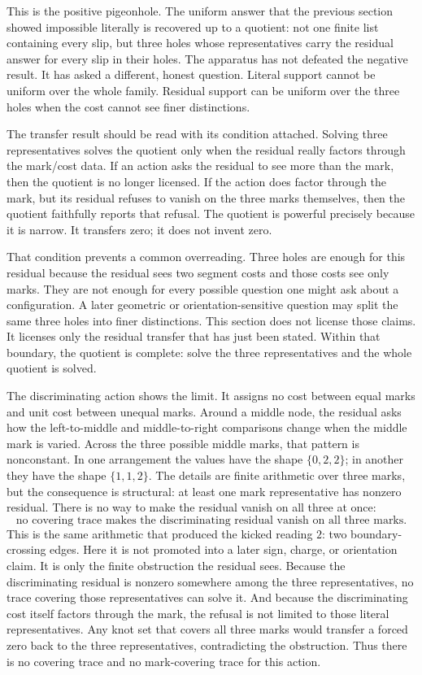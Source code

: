 This is the positive pigeonhole. The uniform answer that the previous section
showed impossible literally is recovered up to a quotient: not one finite list
containing every slip, but three holes whose representatives carry the residual
answer for every slip in their holes. The apparatus has not defeated the
negative result. It has asked a different, honest question. Literal support
cannot be uniform over the whole family. Residual support can be uniform over the
three holes when the cost cannot see finer distinctions.

The transfer result should be read with its condition attached. Solving three
representatives solves the quotient only when the residual really factors
through the mark/cost data. If an action asks the residual to see more than the
mark, then the quotient is no longer licensed. If the action does factor through
the mark, but its residual refuses to vanish on the three marks themselves, then the
quotient faithfully reports that refusal. The quotient is powerful precisely
because it is narrow. It transfers zero; it does not invent zero.

That condition prevents a common overreading. Three holes are enough for this
residual because the residual sees two segment costs and those costs see only
marks. They are not enough for every possible question one might ask about a
configuration. A later geometric or orientation-sensitive question may split the
same three holes into finer distinctions. This section does not license those
claims. It licenses only the residual transfer that has just been stated. Within
that boundary, the quotient is complete: solve the three representatives and the
whole quotient is solved.

The discriminating action shows the limit. It assigns no cost between equal marks
and unit cost between unequal marks. Around a middle node, the residual asks how
the left-to-middle and middle-to-right comparisons change when the middle mark is
varied. Across the three possible middle marks, that pattern is nonconstant. In
one arrangement the values have the shape \(\{0,2,2\}\); in another they have the
shape \(\{1,1,2\}\). The details are finite arithmetic over three marks, but the
consequence is structural: at least one mark representative has nonzero residual.
There is no way to make the residual vanish on all three at once:
\[
  \text{no covering trace makes the discriminating residual vanish on all three marks.}
\]
This is the same arithmetic that produced the kicked reading \(2\): two
boundary-crossing edges. Here it is not promoted into a later sign, charge, or
orientation claim. It is only the finite obstruction the residual sees. Because
the discriminating residual is nonzero somewhere among the three
representatives, no trace covering those representatives can solve it. And
because the discriminating cost itself factors through the mark, the refusal is not
limited to those literal representatives. Any knot set that covers all three
marks would transfer a forced zero back to the three representatives, contradicting
the obstruction. Thus there is no covering trace and no mark-covering trace for
this action.

